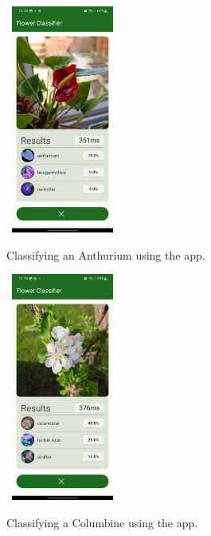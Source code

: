 \documentclass[12pt,a4paper]{report}
\begin{document}
\clearpage

\begin{figure}[h]\
    \includegraphics[width=0.3\textwidth]{anthurium.jpg}
    \caption{Classifying an Anthurium using the app.}
    \label{fig:anthurium}
\end{figure}

\begin{figure}[h]\
    \includegraphics[width=0.3\textwidth]{columbine.jpg}
    \caption{Classifying a Columbine using the app.}
    \label{fig:columbine}
\end{figure}
\end{document}
